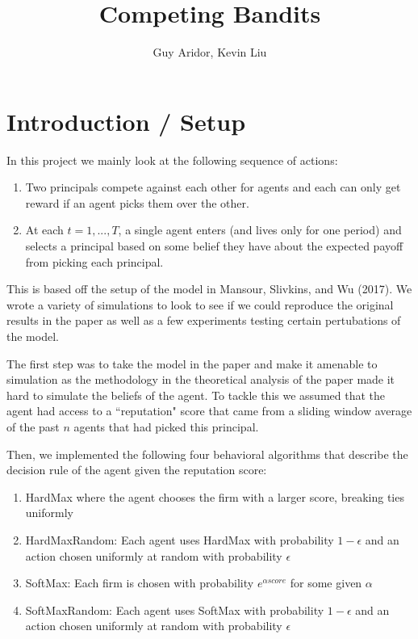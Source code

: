 \documentclass[a4paper]{article}
\begin{document}
 

\title{Competing Bandits}
\author{Guy Aridor, Kevin Liu}
\maketitle

\section*{Introduction / Setup}

In this project we mainly look at the following sequence of actions:
\begin{enumerate}
\item Two principals compete against each other for agents and each can only get reward if an agent picks them over the other.
\item At each $t = 1,...,T$, a single agent enters (and lives only for one period) and selects a principal based on some belief they have about the expected payoff from picking each principal.
\end{enumerate}

This is based off the setup of the model in Mansour, Slivkins, and Wu (2017). We wrote a variety of simulations to look to see if we could reproduce the original results in the paper as well as a few experiments testing certain pertubations of the model.

The first step was to take the model in the paper and make it amenable to simulation as the methodology in the theoretical analysis of the paper made it hard to simulate the beliefs of the agent. To tackle this we assumed that the agent had access to a ``reputation" score that came from a sliding window average of the past $n$ agents that had picked this principal.

Then, we implemented the following four behavioral algorithms that describe the decision rule of the agent given the reputation score:
\begin{enumerate}
\item HardMax where the agent chooses the firm with a larger score, breaking ties uniformly
\item HardMaxRandom: Each agent uses HardMax with probability $1 - \epsilon$ and an action chosen uniformly at random with probability $\epsilon$
\item SoftMax: Each firm is chosen with probability $e^{\alpha score}$ for some given $\alpha$
\item SoftMaxRandom: Each agent uses SoftMax with probability $1 - \epsilon$ and an action chosen uniformly at random with probability $\epsilon$
\end{enumerate}
\end{document}
